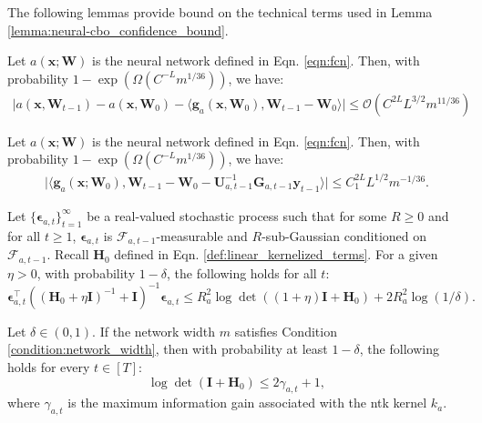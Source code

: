 The following lemmas provide bound on the technical terms used in Lemma \ref{lemma:neural-cbo_confidence_bound}.

\begin{auxlemma} Let $a(\mathbf{x}; \mathbf{W})$ is the neural network defined in Eqn. \ref{eqn:fcn}. Then, with probability $1 - \exp (\Omega(C^{-L} m^{1/36}))$, we have: 
\label{lemma:neural_cbo_network_output_vs_lin_approx}
    \begin{align*}
        \lvert a(\mathbf{x}, \mathbf{W}_{t-1}) - a(\mathbf{x}, \mathbf{W}_{0}) - \langle \mathbf{g}_{a}(\mathbf{x}, \mathbf{W}_0), \mathbf{W}_{t-1} - \mathbf{W}_0 \rangle \rvert \le \mathcal{O}(C^{2L} L^{3/2} m^{11/36})
    \end{align*}
\end{auxlemma}



\begin{auxlemma} Let $a(\mathbf{x}; \mathbf{W})$ is the neural network defined in Eqn. \ref{eqn:fcn}. Then, with probability $1 - \exp (\Omega(C^{-L} m^{1/36}))$, we have: 
\label{lemma:neural_cbo_lin_approx_vs_theoretical_regression_sol}
    \begin{align*}
    \lvert \langle \mathbf{g}_a(\mathbf{x};\mathbf{W}_0), \mathbf{W}_{t-1} - \mathbf{W}_0 - \mathbf{U}_{a,t-1}^{-1} \mathbf{G}_{a,t-1} \mathbf{y}_{t-1} \rangle \rvert \le C_1^{2L} L^{1/2} m^{-1/36}.
    \end{align*}
\end{auxlemma}



\begin{auxlemma}
\label{lemma:neural_cbo_noise_affeted_bound}

Let $\{\boldsymbol{\epsilon}_{a, t}\}_{t=1}^\infty$ be a real-valued stochastic process such that for some $R \geq 0$ and for all $t \geq 1$, $\boldsymbol{\epsilon}_{a, t}$ is $\mathcal{F}_{a, t-1}$-measurable and $R$-sub-Gaussian
conditioned on $\mathcal{F}_{a, t-1}$. Recall $\mathbf{H}_{0}$ defined in Eqn.  \ref{def:linear_kernelized_terms}. For a given
$\eta > 0$, with probability $1 - \delta$, the following holds for all $t$:
\[
\boldsymbol{\epsilon}_{a, t}^\top ((\mathbf{H}_0 + \eta\mathbf{I})^{-1}+\mathbf{I})^{-1} \boldsymbol{\epsilon}_{a, t}
\leq R_a^2 \log \det ((1+\eta)\mathbf{I} + \mathbf{H}_0) + 2R_a^2 \log(1/\delta).
\]
\end{auxlemma}

\begin{auxlemma}
\label{lemma:neural_cbo_log_det_Kt_bound}
Let $\delta \in (0,1)$. If the network width $m$ satisfies  Condition \ref{condition:network_width}, then with probability at least $1-\delta$, the following holds for every $t \in [T]$:
\[ \log \det (\mathbf{I} + \mathbf{H}_0) \le 2\gamma_{a,t} + 1,\]
where $\gamma_{a,t}$ is the maximum information gain associated with the \ac{ntk} kernel $k_a$.
\end{auxlemma}


